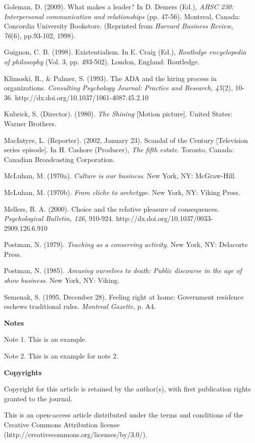\documentclass[twoside,10.5pt]{article}%
\begin{document}
\setlength{\hangindent}{2em}
Goleman, D. (2009). What makes a leader? In D. Demers (Ed.), \emph{AHSC 230: Interpersonal communication and relationships} (pp. 47-56).
Montreal, Canada: Concordia University Bookstore. (Reprinted from \emph{Harvard Business Review, 76}(6),
pp.93-102, 1998).

\setlength{\hangindent}{2em}
Guignon, C. B. (1998). Existentialism. In E. Craig (Ed.), \emph{Routledge encyclopedia of philosophy} (Vol. 3, pp.
493-502). London, England: Routledge.

\setlength{\hangindent}{2em}
Klimoski, R., {\&} Palmer, S. (1993). The ADA and the hiring process
in organizations. \emph{Consulting Psychology Journal: Practice
and Research, 45}(2), 10-36.
http://dx.doi.org/10.1037/1061-4087.45.2.10

\setlength{\hangindent}{2em}
Kubrick, S. (Director). (1980). \emph{The Shining} [Motion picture]. United States: Warner
Brothers.

\setlength{\hangindent}{2em}
MacIntyre, L. (Reporter). (2002, January 23). Scandal of the Century
[Television series episode]. In H. Cashore (Producer), \emph{The fifth estate}. Toronto, Canada:
Canadian Broadcasting Corporation.

\setlength{\hangindent}{2em}
McLuhan, M. (1970a). \emph{Culture is our business}. New York, NY: McGraw-Hill.

\setlength{\hangindent}{2em}
McLuhan, M. (1970b). \emph{From cliche to archetype}. New York, NY: Viking Press.

\setlength{\hangindent}{2em}
Mellers, B. A. (2000). Choice and the relative pleasure of consequences.
\emph{Psychological Bulletin, 126}, 910-924. \linebreak http://dx.doi.org/10.1037/0033-2909.126.6.910

\setlength{\hangindent}{2em}
Postman, N. (1979). \emph{Teaching as a conserving activity}. New York, NY: Delacorte Press.

\setlength{\hangindent}{2em}
Postman, N. (1985). \emph{Amusing ourselves to death: Public discourse in the age of show business}. New York, NY: Viking.

\setlength{\hangindent}{2em}
Semenak, S. (1995, December 28). Feeling right at home: Government residence
eschews traditional rules. \emph{Montreal Gazette}, p. A4.

\vspace{0.5cm}
\textbf{Notes}

Note 1. This is an example.

Note 2. This is an example for note 2.

\vspace{0.5cm}
\textbf{Copyrights}

Copyright for this article is retained by the author(s), with first publication rights granted to the journal.

This is an open-access article distributed under the terms and conditions of the Creative Commons Attribution license (http://creativecommons.org/licenses/by/3.0/).
\end{document}
